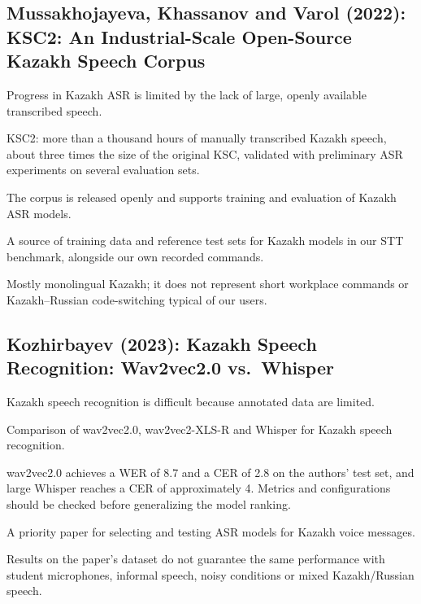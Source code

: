 \documentclass[11pt,a4paper]{article}
\newenvironment{sourceinfo}{\begin{description}[leftmargin=0pt,labelsep=0.5em,font=\normalfont\bfseries]}{\end{description}}
\newcommand{\source}[2]{\subsection{\texorpdfstring{#1~\cite{#2}}{#1}}}
\begin{document}
\source{Mussakhojayeva, Khassanov and Varol (2022): KSC2: An Industrial-Scale Open-Source Kazakh Speech Corpus}{mussakhojayeva2022ksc2}
\begin{sourceinfo}
  \item[Problem.] Progress in Kazakh ASR is limited by the lack of large, openly available transcribed speech.
  \item[Method.] KSC2: more than a thousand hours of manually transcribed Kazakh speech, about three times the size of the original KSC, validated with preliminary ASR experiments on several evaluation sets.
  \item[Reported findings.] The corpus is released openly and supports training and evaluation of Kazakh ASR models.
  \item[Relevance.] A source of training data and reference test sets for Kazakh models in our STT benchmark, alongside our own recorded commands.
  \item[Limitation.] Mostly monolingual Kazakh; it does not represent short workplace commands or Kazakh--Russian code-switching typical of our users.
\end{sourceinfo}

\source{Kozhirbayev (2023): Kazakh Speech Recognition: Wav2vec2.0 vs.\ Whisper}{kozhirbayev2023kazakh}
\begin{sourceinfo}
  \item[Problem.] Kazakh speech recognition is difficult because annotated data are limited.
  \item[Method.] Comparison of wav2vec2.0, wav2vec2-XLS-R and Whisper for Kazakh speech recognition.
  \item[Reported findings.] wav2vec2.0 achieves a WER of 8.7 and a CER of 2.8 on the authors' test set, and large Whisper reaches a CER of approximately 4. Metrics and configurations should be checked before generalizing the model ranking.
  \item[Relevance.] A priority paper for selecting and testing ASR models for Kazakh voice messages.
  \item[Limitation.] Results on the paper's dataset do not guarantee the same performance with student microphones, informal speech, noisy conditions or mixed Kazakh/Russian speech.
\end{sourceinfo}
\end{document}
